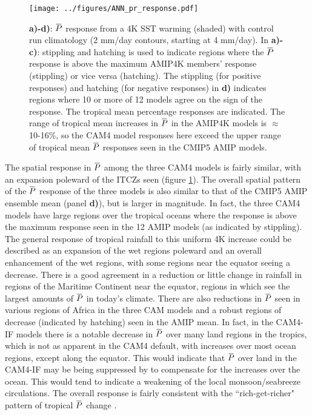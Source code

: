 \documentclass[letterpaper,12pt,titlepage,oneside,final]{book}
\newcommand{\overbar}[1]{\mkern 1.5mu\overline{\mkern-1.5mu#1\mkern-1.5mu}\mkern 1.5mu}
\begin{document}
\begin{figure}[H]
\centering
\noindent\texttt{[image: ../figures/ANN\_pr\_response.pdf]}\hfill
\caption{\textbf{a)-d)}: $\overbar{P}$ response from a 4K SST warming (shaded) with control run climatology (2 mm/day contours, starting at 4 mm/day). In \textbf{a)-c)}: stippling and hatching is used to indicate regions where the $\overbar{P}$ response is above the maximum AMIP4K members' response (stippling) or vice versa (hatching). The stippling (for positive responses) and hatching (for negative responses) in \textbf{d)} indicates regions where 10 or more of 12 models agree on the sign of the response. The tropical mean percentage responses are indicated. The range of tropical mean increases in $\overbar{P}$ in the AMIP4K models is $\approx$ 10-16\%, so the CAM4 model responses here exceed the upper range of tropical mean $\overbar{P}$ responses seen in the CMIP5 AMIP models.}
\label{fig:presponse}
\end{figure}
The spatial response in $\overbar{P}$ among the three CAM4 models is fairly similar, with an expansion poleward of the ITCZs seen (figure \ref{fig:presponse}). The overall spatial pattern of the $\overbar{P}$ response of the three models is also similar to that of the CMIP5 AMIP ensemble mean (panel \textbf{d)}), but is larger in magnitude. In fact, the three CAM4 models have large regions over the tropical oceans where the response is above the maximum response seen in the 12 AMIP models (as indicated by stippling). The general response of tropical rainfall to this uniform 4K increase could be described as an expansion of the wet regions poleward and an overall enhancement of the wet regions, with some regions near the equator seeing a decrease. There is a good agreement in a reduction or little change in rainfall in regions of the Maritime Continent near the equator, regions in which see the largest amounts of $\overbar{P}$ in today's climate. There are also reductions in $\overbar{P}$ seen in various regions of Africa in the three CAM models and a robust regions of decrease (indicated by hatching) seen in the AMIP mean. In fact, in the CAM4-IF models there is a notable decrease in $\overbar{P}$ over many land regions in the tropics, which is not as apparent in the CAM4 default, with increases over most ocean regions, except along the equator. This would indicate that $\overbar{P}$ over land in the CAM4-IF may be being suppressed by to compensate for the increases over the ocean. This would tend to indicate a weakening of the local monsoon/seabreeze circulations. The overall response is fairly consistent with the ``rich-get-richer" pattern of tropical $\overbar{P}$ change \citep{held_robust_2006,chou_evaluating_2009}.
\end{document}
